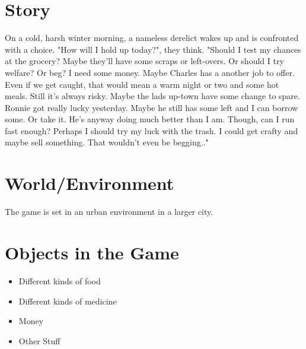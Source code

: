 \documentclass[a4paper]{scrreprt}
\begin{document}
\section{Story}

On a cold, harsh winter morning, a nameless derelict wakes up and is confronted with a choice. "How will I hold up today?", they think. "Should I test my chances at the grocery? Maybe they'll have some scraps or left-overs. Or should I try welfare? Or beg? I need some money. Maybe Charles has a another job to offer. Even if we get caught, that would mean a warm night or two and some hot meals. Still it's always risky. Maybe the lads up-town have some change to spare. Ronnie got really lucky yesterday. Maybe he still has some left and I can borrow some. Or take it. He's anyway doing much better than I am. Though, can I run fast enough? Perhaps I should try my luck with the trash. I could get crafty and maybe sell something. That wouldn't even be begging.."

\section{World/Environment} 
The game is set in an urban environment in a larger city.

\section{Objects in the Game}
\begin{itemize}
	\item Different kinds of food
	\item Different kinds of medicine
	\item Money
	\item Other Stuff
\end{itemize}
\end{document}
